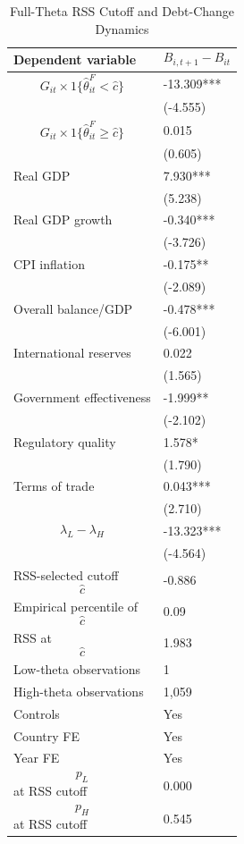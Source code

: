 \begin{table}[H]\centering
\begin{threeparttable}
\caption{Full-Theta RSS Cutoff and Debt-Change Dynamics}
\label{tab:deltaB_rss_cutoff_fulltheta}
\scriptsize
\begin{tabularx}{\textwidth}{lY}
\toprule
Dependent variable & $$B_{i,t+1}-B_{it}$$ \\
\midrule
$$G_{it}\times 1\{\widehat{\theta}^{F}_{it}<\widehat{c}\}$$ & -13.309*** \\
 & (-4.555) \\
$$G_{it}\times 1\{\widehat{\theta}^{F}_{it}\geq\widehat{c}\}$$ & 0.015 \\
 & (0.605) \\
Real GDP & 7.930*** \\
 & (5.238) \\
Real GDP growth & -0.340*** \\
 & (-3.726) \\
CPI inflation & -0.175** \\
 & (-2.089) \\
Overall balance/GDP & -0.478*** \\
 & (-6.001) \\
International reserves & 0.022 \\
 & (1.565) \\
Government effectiveness & -1.999** \\
 & (-2.102) \\
Regulatory quality & 1.578* \\
 & (1.790) \\
Terms of trade & 0.043*** \\
 & (2.710) \\
$$\lambda_L-\lambda_H$$ & -13.323*** \\
 & (-4.564) \\
\midrule
RSS-selected cutoff $$\widehat{c}$$ & -0.886 \\
Empirical percentile of $$\widehat{c}$$ & 0.09 \\
RSS at $$\widehat{c}$$ & 1.983 \\
Low-theta observations & 1 \\
High-theta observations & 1,059 \\
Controls & Yes \\
Country FE & Yes \\
Year FE & Yes \\
$$p_L$$ at RSS cutoff & 0.000 \\
$$p_H$$ at RSS cutoff & 0.545 \\

\end{tabularx}
\end{threeparttable}
\end{table}
